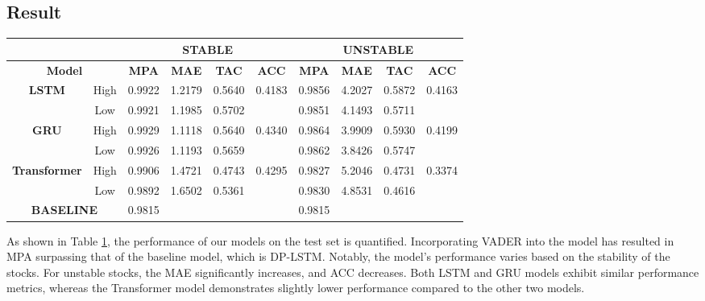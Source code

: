 \subsection{Result}


\begin{table}[h]
	\label{tab:result}
	\centering
	\begin{tabular}{c|c|c|c|c|c|c|c|c|c}
	\toprule\toprule
	\multicolumn{2}{c}{}& \multicolumn{4}{|c|}{\textbf{STABLE}} & \multicolumn{4}{c}{\textbf{UNSTABLE}} \\
	\midrule
	\multicolumn{2}{c|}{\textbf{Model}} & \textbf{MPA} & \textbf{MAE} & \textbf{TAC} & \textbf{ACC} & \textbf{MPA} & \textbf{MAE} & \textbf{TAC} & \textbf{ACC} \\ 
	\midrule
	\multirow{ 2}{*}{\textbf{LSTM}} & High			& 	0.9922& 	1.2179& 	0.5640& \multirow{ 2}{*}{0.4183}
					  								& 	0.9856& 	4.2027& 	0.5872& \multirow{ 2}{*}{0.4163}	\\ 
									& Low			& 	0.9921& 	1.1985& 	0.5702& 
					  								& 	0.9851& 	4.1493& 	0.5711& 							\\ 
	\multirow{ 2}{*}{\textbf{GRU}} 	& High			& 	0.9929& 	1.1118& 	0.5640& \multirow{ 2}{*}{0.4340}	
													& 	0.9864& 	3.9909& 	0.5930& \multirow{ 2}{*}{0.4199} 	\\ 
									& Low			& 	0.9926& 	1.1193& 	0.5659& 	
													& 	0.9862& 	3.8426& 	0.5747& 							\\ 
	\multirow{ 2}{*}{\textbf{Transformer}} 	& High	& 	0.9906& 	1.4721& 	0.4743& \multirow{ 2}{*}{0.4295}	
													& 	0.9827& 	5.2046& 	0.4731& \multirow{ 2}{*}{0.3374} 	\\ 
											& Low	& 	0.9892& 	1.6502& 	0.5361& 
													& 	0.9830& 	4.8531& 	0.4616& 							\\ 
	\midrule
	\multicolumn{ 2}{c|}{\textbf{BASELINE}}			& 	0.9815& 		 & 		 & 	
					  								& 	0.9815& 		 & 		 & 									\\
	\bottomrule
	\bottomrule
	\end{tabular}
\end{table}
As shown in Table \ref{tab:result}, the performance of our models on the test set is quantified. Incorporating VADER into the model has resulted in MPA surpassing that of the baseline model, which is DP-LSTM. 
Notably, the model's performance varies based on the stability of the stocks. For unstable stocks, the MAE significantly increases, and ACC decreases.
Both LSTM and GRU models exhibit similar performance metrics, whereas the Transformer model demonstrates slightly lower performance compared to the other two models. 
